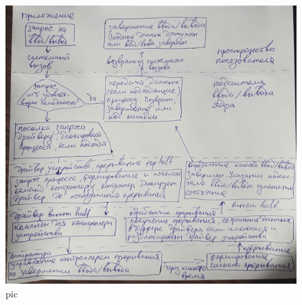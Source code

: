 \begin{figure}[H]
  \centering
  \includegraphics[width=\textwidth]{pic/2.png}
  \caption{pic}
\end{figure}